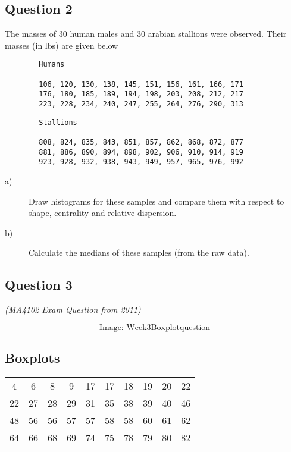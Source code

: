 \documentclass[]{article}
\begin{document}
\subsection*{Question 2}
The masses of 30 human males and 30 arabian stallions were observed. Their masses (in lbs) are given below
{
	\large
	\begin{framed}
		\begin{verbatim}
		Humans
		
		106, 120, 130, 138, 145, 151, 156, 161, 166, 171
		176, 180, 185, 189, 194, 198, 203, 208, 212, 217
		223, 228, 234, 240, 247, 255, 264, 276, 290, 313
		\end{verbatim}
	\end{framed}
}
\newpage
{
	\large
	\begin{framed}
		\begin{verbatim}
		Stallions
		
		808, 824, 835, 843, 851, 857, 862, 868, 872, 877
		881, 886, 890, 894, 898, 902, 906, 910, 914, 919
		923, 928, 932, 938, 943, 949, 957, 965, 976, 992
		\end{verbatim}
	\end{framed}
}
\begin{description}
	\item[a)]	Draw histograms for these samples and compare them with respect to shape, centrality and relative dispersion. 
	\item[b)]	Calculate the medians of these samples (from the raw data).
	
\end{description}
\subsection*{Question 3}
\textit{(MA4102 Exam Question from 2011)}

\[\mbox{Image: Week3Boxplotquestion}\]

\subsection{Boxplots}
\begin{center}
	\begin{tabular}{cccccccccc}
		\hline 
		4 & 6 & 8 & 9 & 17 & 17 & 18 & 19 & 20 & 22 \\ 
		
		22 & 27 & 28 & 29 & 31 & 35 & 38 & 39 & 40 & 46 \\ 	
		48 & 56 & 56 & 57 & 57 & 58 & 58 & 60 & 61 & 62 \\ 	
		64 & 66 & 68 & 69 & 74 & 75 & 78 & 79 & 80 & 82 \\ \hline
		
	\end{tabular} 
\end{center}
\end{document}
